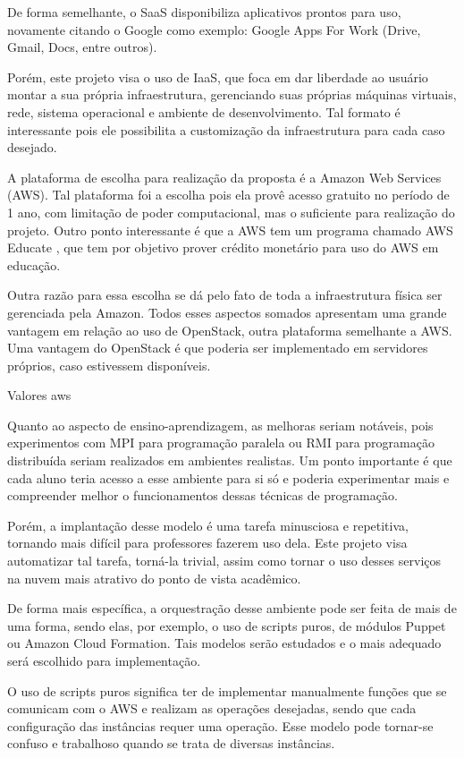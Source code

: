 \documentclass[12pt]{article}
\begin{document}
De forma semelhante, o SaaS disponibiliza aplicativos prontos para uso, novamente citando o Google como exemplo: Google Apps For Work (Drive, Gmail, Docs, entre outros).

Porém, este projeto visa o uso de IaaS, que foca em dar liberdade ao usuário montar a sua própria infraestrutura, gerenciando suas próprias máquinas virtuais, rede, sistema operacional e ambiente de desenvolvimento. Tal formato é interessante pois ele possibilita a customização da infraestrutura para cada caso desejado.

A plataforma de escolha para realização da proposta é a Amazon Web Services (AWS). Tal plataforma foi a escolha pois ela provê acesso gratuito no período de 1 ano, com limitação de poder computacional, mas o  suficiente para realização do projeto. Outro ponto interessante é que a AWS tem um programa chamado AWS Educate \cite{awsedu}, que tem por objetivo prover crédito monetário para uso do AWS em educação.

Outra razão para essa escolha se dá pelo fato de toda a infraestrutura física ser gerenciada pela Amazon. Todos esses aspectos somados apresentam uma grande vantagem em relação ao uso de OpenStack, outra plataforma semelhante a AWS. Uma vantagem do OpenStack é que poderia ser implementado em servidores próprios, caso estivessem disponíveis.


Valores aws

Quanto ao aspecto de ensino-aprendizagem, as melhoras seriam notáveis, pois experimentos com MPI para programação paralela ou RMI para programação distribuída seriam realizados em ambientes realistas. Um ponto importante é que cada aluno teria acesso a esse ambiente para si só e poderia experimentar mais e compreender melhor o funcionamentos dessas técnicas de programação.

Porém, a implantação desse modelo é uma tarefa minusciosa e repetitiva, tornando mais difícil para professores fazerem uso dela. Este projeto visa automatizar tal tarefa, torná-la trivial, assim como tornar o uso desses serviços na nuvem mais atrativo do ponto de vista acadêmico.

De forma mais específica, a orquestração desse ambiente pode ser feita de mais de uma forma, sendo elas, por exemplo, o uso de scripts puros, de módulos Puppet ou Amazon Cloud Formation. Tais modelos serão estudados e o mais adequado será escolhido para implementação.

O uso de scripts puros significa ter de implementar manualmente funções que se comunicam com o AWS e realizam as operações desejadas, sendo que cada configuração das instâncias requer uma operação. Esse modelo pode tornar-se confuso e trabalhoso quando se trata de diversas instâncias.
\end{document}
